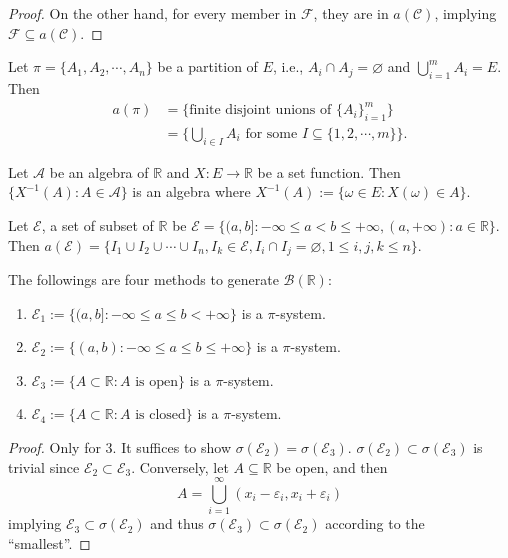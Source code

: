 \documentclass[11pt,singlecolumn, openany, citestyle=authoryear]{elegantbook}
\begin{document}
\begin{CJK}{UTF8}{gbsn}
\begin{proof}
    On the other hand, for every member in $\mathcal{F}$, they are in $a(\mathcal{C})$,
    implying $\mathcal{F}\subseteq a(\mathcal{C})$.
\end{proof}

\begin{example}
    Let $\pi=\{A_1,A_2,\cdots,A_n\}$ be a partition of $E$, i.e., $A_i \cap A_j = \varnothing$
    and $\displaystyle \bigcup_{i=1}^m A_i=E$. Then 
    \begin{align*}
        a(\pi) &= \{\text{finite disjoint unions of } \{A_i\}_{i=1}^m\}\\
        &= \bigg\{\bigcup_{i \in I}A_i \text{ for some } I 
        \subseteq \{1,2,\cdots,m\}\bigg\}.
    \end{align*}
\end{example}

\begin{example}
    Let $\mathcal{A}$ be an algebra of $\mathbb{R}$ and $X: E \to \mathbb{R}$ be a set function.
    Then $\{X^{-1}(A):A \in \mathcal{A}\}$ is an algebra where $X^{-1}(A):=\{\omega \in E:
    X(\omega) \in A\}$.
\end{example}

\begin{example}\label{eg:eg1}
    Let $\mathcal{E}$, a set of subset of $\mathbb{R}$ 
    be $\mathcal{E}=\{(a,b]:-\infty \leqslant a < b \leqslant +\infty,
    (a,+\infty):a \in \mathbb{R}\}$.
    Then $a(\mathcal{E})=\{I_1\cup I_2\cup \cdots \cup I_n, I_k \in \mathcal{E},
    I_i \cap I_j = \varnothing, 1 \leqslant i,j,k \leqslant n\}$.
\end{example}

\begin{example}
    The followings are four methods to generate $\mathcal{B}(\mathbb{R})$:
    \begin{enumerate}
    \item $\mathcal{E}_1:=\{(a,b]:-\infty \leqslant a \leqslant b < +\infty\}$ is a 
    $\pi$-system.
    \item $\mathcal{E}_2:=\{(a,b):-\infty \leqslant a \leqslant b \leqslant +\infty\}$ is a 
    $\pi$-system.
    \item $\mathcal{E}_3:=\{A\subset \mathbb{R}:A \text{ is open}\}$ is a 
    $\pi$-system.
    \item $\mathcal{E}_4:=\{A\subset \mathbb{R}:A \text{ is closed}\}$ is a 
    $\pi$-system.
    \end{enumerate}
\end{example}
\begin{proof}
    Only for 3.
    It suffices to show $\sigma(\mathcal{E}_2)=\sigma(\mathcal{E}_3)$.
    $\sigma(\mathcal{E}_2)\subset \sigma(\mathcal{E}_3)$ is trivial since $\mathcal{E}_2 \subset \mathcal{E}_3$. 
    Conversely, let $A\subseteq \mathbb{R}$ be open, and then 
    $$
    A=\bigcup_{i=1}^\infty (x_i-\varepsilon_i,x_i+\varepsilon_i)
    $$
    implying $\mathcal{E}_3 \subset \sigma(\mathcal{E}_2)$ and thus 
    $\sigma(\mathcal{E}_3)\subset\sigma(\mathcal{E}_2)$ according to the ``smallest''.
\end{proof}


\end{CJK}
\end{document}
